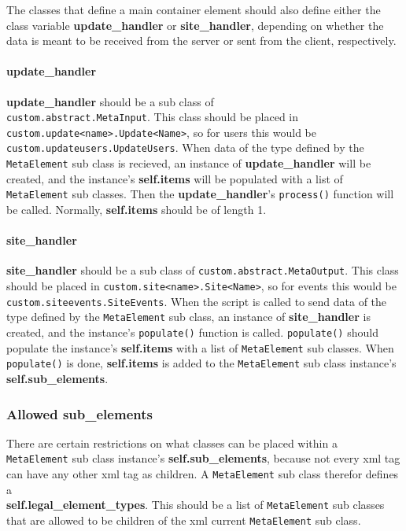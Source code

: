 The classes that define a main container element should also define either the
class variable \textbf{update\_handler} or \textbf{site\_handler}, depending on
whether the data is meant to be received from the server or sent from the
client, respectively. 

\paragraph{update\_handler}
\textbf{update\_handler} should be a sub class of \\
\texttt{custom.abstract.MetaInput}. This class should be placed in \\
\texttt{custom.update<name>.Update<Name>}, so for users this would be \\
\texttt{custom.updateusers.UpdateUsers}. When data of the type defined by the
\texttt{MetaElement} sub class is recieved, an instance of
\textbf{update\_handler} will be created, and the instance's
\textbf{self.items} will be populated with a list of \texttt{MetaElement} sub
classes. Then the \textbf{update\_handler}'s \texttt{process()} function will
be called.  Normally, \textbf{self.items} should be of length 1.

\paragraph{site\_handler}
\textbf{site\_handler} should be a sub class of
\texttt{custom.abstract.MetaOutput}. This class should be placed in
\texttt{custom.site<name>.Site<Name>}, so for events this would be
\texttt{custom.siteevents.SiteEvents}. When the script is called to send data
of the type defined by the \texttt{MetaElement} sub class, an instance of
\textbf{site\_handler} is created, and the instance's \texttt{populate()}
function is called. \texttt{populate()} should populate the instance's
\textbf{self.items} with a list of \texttt{MetaElement} sub classes. When
\texttt{populate()} is done, \textbf{self.items} is added to the
\texttt{MetaElement} sub class instance's \textbf{self.sub\_elements}.

\subsubsection{Allowed sub\_elements}
There are certain restrictions on what classes can be placed within a
\texttt{MetaElement} sub class instance's \textbf{self.sub\_elements}, because
not every \gls{xml} tag can have any other \gls{xml} tag as children. A
\texttt{MetaElement} sub class therefor defines a \\
\textbf{self.legal\_element\_types}. This should be a list of
\texttt{MetaElement} sub classes that are allowed to be children of the
\gls{xml} current \texttt{MetaElement} sub class. 

